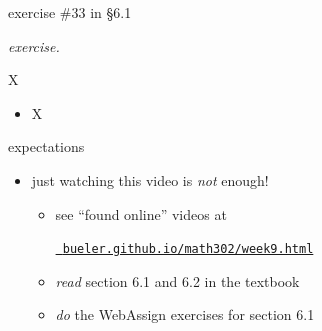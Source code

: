 \documentclass[urlcolor=blue,dvipsnames]{beamer}
\begin{document}
\begin{frame}{exercise \#33 in \S 6.1}

\noindent \emph{exercise.}  

\vspace{60mm}
\end{frame}


\begin{frame}{X}

\begin{itemize}
\item X
\end{itemize}
\end{frame}


\begin{frame}{expectations}

\begin{itemize}
\item just watching this video is \emph{not} enough!
     \begin{itemize}
     \item see ``found online'' videos at

     \centerline{\href{https://bueler.github.io/math302/week9.html}{\tt \color{cyan} bueler.github.io/math302/week9.html}}
     \item \emph{read} section 6.1 and 6.2 in the textbook
     \item \emph{do} the WebAssign exercises for section 6.1
     \end{itemize}
\end{itemize}
\end{frame}
\end{document}
